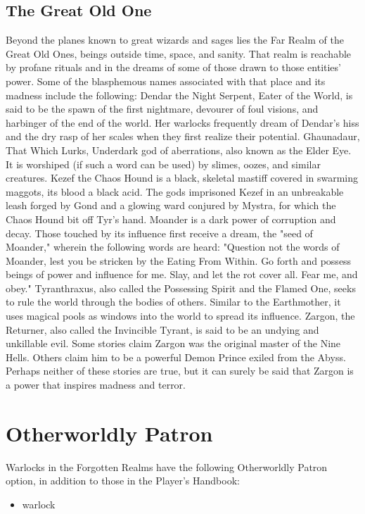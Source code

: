 \documentclass[10pt,a4paper,twoside,twocolumn,openany,bg=print,nodeprecatedcode]{dndbook}
\begin{document}
\subsection{The Great Old One}
Beyond the planes known to great wizards and sages lies the Far Realm of the Great Old Ones, beings outside time, space, and sanity. That realm is reachable by profane rituals and in the dreams of some of those drawn to those entities' power. Some of the blasphemous names associated with that place and its madness include the following: Dendar the Night Serpent, Eater of the World, is said to be the spawn of the first nightmare, devourer of foul visions, and harbinger of the end of the world. Her warlocks frequently dream of Dendar's hiss and the dry rasp of her scales when they first realize their potential. Ghaunadaur, That Which Lurks, Underdark god of aberrations, also known as the Elder Eye. It is worshiped (if such a word can be used) by slimes, oozes, and similar creatures. Kezef the Chaos Hound is a black, skeletal mastiff covered in swarming maggots, its blood a black acid. The gods imprisoned Kezef in an unbreakable leash forged by Gond and a glowing ward conjured by Mystra, for which the Chaos Hound bit off Tyr's hand. Moander is a dark power of corruption and decay. Those touched by its influence first receive a dream, the "seed of Moander," wherein the following words are heard: "Question not the words of Moander, lest you be stricken by the Eating From Within. Go forth and possess beings of power and influence for me. Slay, and let the rot cover all. Fear me, and obey." Tyranthraxus, also called the Possessing Spirit and the Flamed One, seeks to rule the world through the bodies of others. Similar to the Earthmother, it uses magical pools as windows into the world to spread its influence. Zargon, the Returner, also called the Invincible Tyrant, is said to be an undying and unkillable evil. Some stories claim Zargon was the original master of the Nine Hells. Others claim him to be a powerful Demon Prince exiled from the Abyss. Perhaps neither of these stories are true, but it can surely be said that Zargon is a power that inspires madness and terror.
\section{Otherworldly Patron}
Warlocks in the Forgotten Realms have the following Otherworldly Patron option, in addition to those in the Player's Handbook:

\begin{itemize}
\item warlock
\end{itemize}
\end{document}
